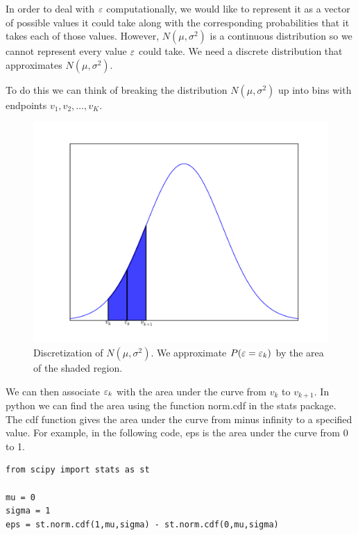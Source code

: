 In order to deal with $\varepsilon$ computationally, we would like to represent it as a vector of possible values it could take along with the corresponding probabilities that it takes each of those values.  However, $N(\mu,\sigma^2)$ is a continuous distribution so we cannot represent every value $\varepsilon$ could take.  We need a discrete distribution that approximates $N(\mu,\sigma^2)$.

To do this we can think of breaking the distribution $N(\mu,\sigma^2)$ up into bins with endpoints $v_1,v_2,\ldots, v_K$.

\begin{figure}[h!]
\label{stoch1_fig1}
\begin{center}
\includegraphics[width = \textwidth]{discnorm.pdf}
\end{center}
\caption{Discretization of $N(\mu,\sigma^2)$.  We approximate $P(\varepsilon = \varepsilon_k)$ by the area of the shaded region.}
\end{figure}

We can then associate $\varepsilon_k$ with the area under the curve from $v_k$ to $v_{k+1}$.  In python we can find the area using the function norm.cdf in the stats package.  The cdf function gives the area under the curve from minus infinity to a specified value.  For example, in the following code, eps is the area under the curve from 0 to 1.

\begin{lstlisting}
from scipy import stats as st

mu = 0
sigma = 1
eps = st.norm.cdf(1,mu,sigma) - st.norm.cdf(0,mu,sigma)
\end{lstlisting}

